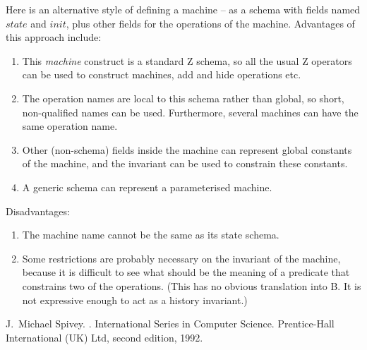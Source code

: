 \documentclass{article}
\begin{document}
  
Here is an alternative style of defining a machine -- as a
schema with fields named $state$ and $init$, plus other
fields for the operations of the machine.  
Advantages of this approach include:
\begin{enumerate}

\item This \emph{machine} construct is a standard Z schema, 
  so all the usual Z operators can be used to construct machines, 
  add and hide operations etc.  

\item The operation names are local to this schema rather than global, 
  so short, non-qualified names can be used.  Furthermore, several
  machines can have the same operation name.

\item Other (non-schema) fields inside the machine can represent
  global constants of the machine, and the invariant can be used
  to constrain these constants.

\item A generic schema can represent a parameterised machine.  
\end{enumerate}

Disadvantages: 
\begin{enumerate}
\item The machine name cannot be the same as its state schema.  
\item Some restrictions are probably necessary on the invariant
  of the machine, because it is difficult to see what should be
  the meaning of a predicate that constrains two of the operations.
  (This has no obvious translation into B.  It is not expressive
  enough to act as a history invariant.)
\end{enumerate}



% 

\begin{thebibliography}{1}
J.~Michael Spivey.
.
\newblock International Series in Computer Science. Prentice-Hall International
  (UK) Ltd, second edition, 1992.
\end{thebibliography}
\end{document}
